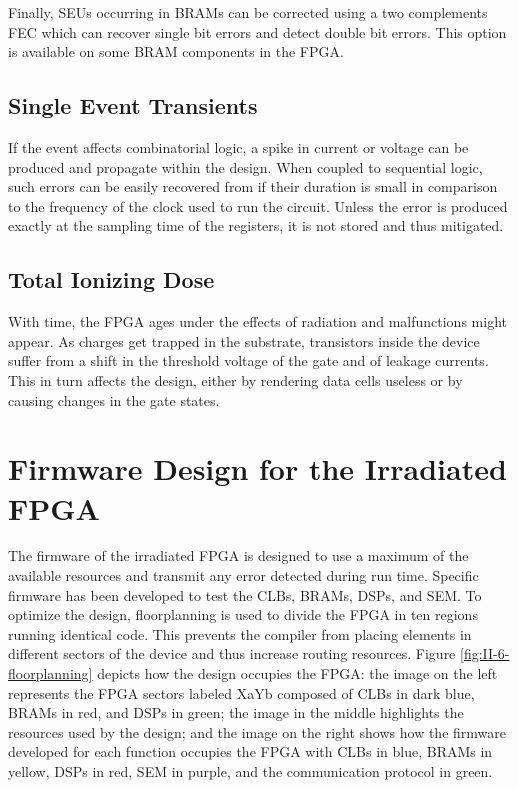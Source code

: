       Finally, SEUs occurring in BRAMs can be corrected using a two complements FEC which can recover single bit errors and detect double bit errors. This option is available on some BRAM components in the FPGA.

    \subsection{Single Event Transients}

      If the event affects combinatorial logic, a spike in current or voltage can be produced and propagate within the design. When coupled to sequential logic, such errors can be easily recovered from if their duration is small in comparison to the frequency of the clock used to run the circuit. Unless the error is produced exactly at the sampling time of the registers, it is not stored and thus mitigated.

    \subsection{Total Ionizing Dose}

      With time, the FPGA ages under the effects of radiation and malfunctions might appear. As charges get trapped in the substrate, transistors inside the device suffer from a shift in the threshold voltage of the gate and of leakage currents. This in turn affects the design, either by rendering data cells useless or by causing changes in the gate states.

  \section{Firmware Design for the Irradiated FPGA}

    The firmware of the irradiated FPGA is designed to use a maximum of the available resources and transmit any error detected during run time. Specific firmware has been developed to test the CLBs, BRAMs, DSPs, and SEM. To optimize the design, floorplanning is used to divide the FPGA in ten regions running identical code. This prevents the compiler from placing elements in different sectors of the device and thus increase routing resources. Figure \ref{fig:II-6-floorplanning} depicts how the design occupies the FPGA: the image on the left represents the FPGA sectors labeled XaYb composed of CLBs in dark blue, BRAMs in red, and DSPs in green; the image in the middle highlights the resources used by the design; and the image on the right shows how the firmware developed for each function occupies the FPGA with CLBs in blue, BRAMs in yellow, DSPs in red, SEM in purple, and the communication protocol in green.

